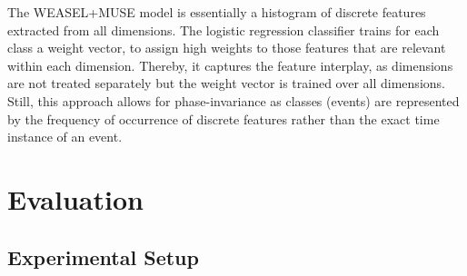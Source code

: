 \documentclass[sigconf]{acmart}
\begin{document}
The WEASEL+MUSE model is essentially a histogram of discrete features extracted from all dimensions. The logistic regression classifier trains for each class a weight vector, to assign high weights to those features that are relevant within each dimension. Thereby, it captures the feature interplay, as dimensions are not treated separately but the weight vector is trained over all dimensions. Still, this approach allows for phase-invariance as classes (events) are represented by the frequency of occurrence of discrete features rather than the exact time instance of an event.


\section{Evaluation}\label{sec:Results}
\subsection{Experimental Setup}
\end{document}
